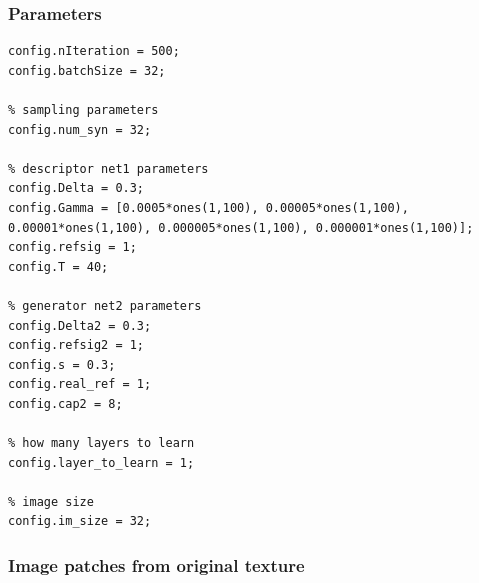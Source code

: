 \documentclass[letter]{article}
\begin{document}
\newpage

\subsubsection*{Parameters}

\begin{lstlisting}
config.nIteration = 500;      
config.batchSize = 32;
                                
% sampling parameters
config.num_syn = 32;

% descriptor net1 parameters
config.Delta = 0.3;
config.Gamma = [0.0005*ones(1,100), 0.00005*ones(1,100), 0.00001*ones(1,100), 0.000005*ones(1,100), 0.000001*ones(1,100)];
config.refsig = 1;                                            
config.T = 40;             
                                                                                                   
% generator net2 parameters
config.Delta2 = 0.3;
config.refsig2 = 1;
config.s = 0.3;
config.real_ref = 1;
config.cap2 = 8;

% how many layers to learn
config.layer_to_learn = 1;

% image size
config.im_size = 32;
\end{lstlisting}

\newpage

\subsubsection*{Image patches from original texture}
\end{document}

